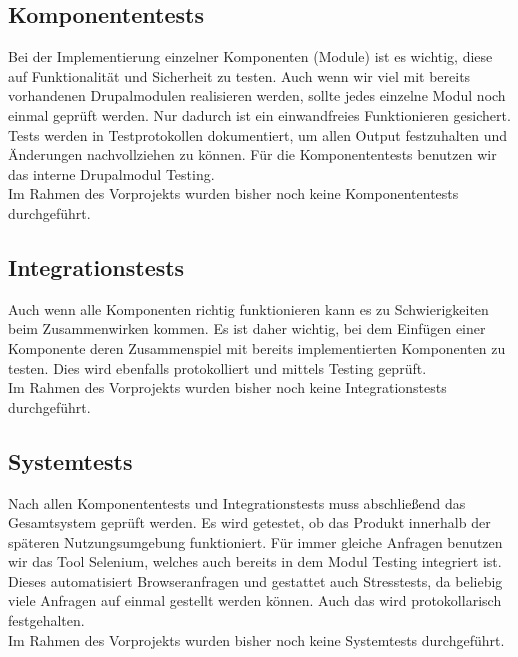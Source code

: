 \documentclass{swp}
\begin{document}
\subsection{Komponententests}
Bei der Implementierung einzelner Komponenten (Module) ist es wichtig, diese auf Funktionalit\"at und Sicherheit zu testen. Auch wenn wir viel mit bereits vorhandenen Drupalmodulen realisieren werden, sollte jedes einzelne Modul noch einmal gepr\"uft werden. Nur dadurch ist ein einwandfreies Funktionieren gesichert. Tests werden in Testprotokollen dokumentiert, um allen Output festzuhalten und \"Anderungen nachvollziehen zu k\"onnen. F\"ur die Komponententests benutzen wir das interne Drupalmodul \glqq Testing\grqq{}. \\
Im Rahmen des Vorprojekts wurden bisher noch keine Komponententests durchgef\"uhrt.
\subsection{Integrationstests}
Auch wenn alle Komponenten richtig funktionieren kann es zu Schwierigkeiten beim Zusammenwirken kommen. Es ist daher wichtig, bei dem Einf\"ugen einer Komponente deren Zusammenspiel mit bereits implementierten Komponenten zu testen. Dies wird ebenfalls protokolliert und mittels \glqq Testing\grqq{} gepr\"uft.\\
Im Rahmen des Vorprojekts wurden bisher noch keine Integrationstests durchgef\"uhrt.
\subsection{Systemtests}
Nach allen Komponententests und Integrationstests muss abschlie{\ss}end das Gesamtsystem gepr\"uft werden. Es wird getestet, ob das Produkt innerhalb der sp\"ateren Nutzungsumgebung funktioniert. F\"ur immer gleiche Anfragen benutzen wir das Tool \glqq Selenium\grqq{}, welches auch bereits in dem Modul \glqq Testing\grqq{} integriert ist. Dieses automatisiert Browseranfragen und gestattet auch Stresstests, da beliebig viele Anfragen auf einmal gestellt werden k\"onnen. Auch das wird protokollarisch festgehalten.\\
Im Rahmen des Vorprojekts wurden bisher noch keine Systemtests durchgef\"uhrt.
\end{document}
